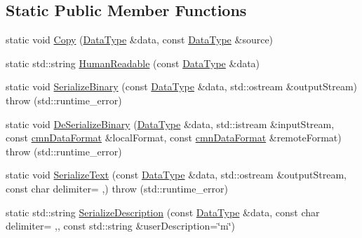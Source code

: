 \subsection*{Static Public Member Functions}
\begin{DoxyCompactItemize}
\item 
static void \hyperlink{classcmn_data_3_01vct_dynamic_matrix_3_01__element_type_01_4_01_4_aeb810ce558573cd7565f917e0602279c}{Copy} (\hyperlink{classcmn_data_3_01vct_dynamic_matrix_3_01__element_type_01_4_01_4_aac077247ac3ce4c624c4636509abe930}{Data\+Type} \&data, const \hyperlink{classcmn_data_3_01vct_dynamic_matrix_3_01__element_type_01_4_01_4_aac077247ac3ce4c624c4636509abe930}{Data\+Type} \&source)
\item 
static std\+::string \hyperlink{classcmn_data_3_01vct_dynamic_matrix_3_01__element_type_01_4_01_4_af4dcadd34973a91ea24bb8418c6e851a}{Human\+Readable} (const \hyperlink{classcmn_data_3_01vct_dynamic_matrix_3_01__element_type_01_4_01_4_aac077247ac3ce4c624c4636509abe930}{Data\+Type} \&data)
\item 
static void \hyperlink{classcmn_data_3_01vct_dynamic_matrix_3_01__element_type_01_4_01_4_a0b7d4584c6cee0d7eea2e5f63108aaa0}{Serialize\+Binary} (const \hyperlink{classcmn_data_3_01vct_dynamic_matrix_3_01__element_type_01_4_01_4_aac077247ac3ce4c624c4636509abe930}{Data\+Type} \&data, std\+::ostream \&output\+Stream)  throw (std\+::runtime\+\_\+error)
\item 
static void \hyperlink{classcmn_data_3_01vct_dynamic_matrix_3_01__element_type_01_4_01_4_af2373fc5271a0722a486f6f314482d91}{De\+Serialize\+Binary} (\hyperlink{classcmn_data_3_01vct_dynamic_matrix_3_01__element_type_01_4_01_4_aac077247ac3ce4c624c4636509abe930}{Data\+Type} \&data, std\+::istream \&input\+Stream, const \hyperlink{classcmn_data_format}{cmn\+Data\+Format} \&local\+Format, const \hyperlink{classcmn_data_format}{cmn\+Data\+Format} \&remote\+Format)  throw (std\+::runtime\+\_\+error)
\item 
static void \hyperlink{classcmn_data_3_01vct_dynamic_matrix_3_01__element_type_01_4_01_4_a9fee51b67154773978290c97509e9b68}{Serialize\+Text} (const \hyperlink{classcmn_data_3_01vct_dynamic_matrix_3_01__element_type_01_4_01_4_aac077247ac3ce4c624c4636509abe930}{Data\+Type} \&data, std\+::ostream \&output\+Stream, const char delimiter= \textquotesingle{},\textquotesingle{})  throw (std\+::runtime\+\_\+error)
\item 
static std\+::string \hyperlink{classcmn_data_3_01vct_dynamic_matrix_3_01__element_type_01_4_01_4_af8d49011b80b2913bc4a8d713a55700a}{Serialize\+Description} (const \hyperlink{classcmn_data_3_01vct_dynamic_matrix_3_01__element_type_01_4_01_4_aac077247ac3ce4c624c4636509abe930}{Data\+Type} \&data, const char delimiter= \textquotesingle{},\textquotesingle{}, const std\+::string \&user\+Description=\char`\"{}m\char`\"{})

\end{DoxyCompactItemize}
